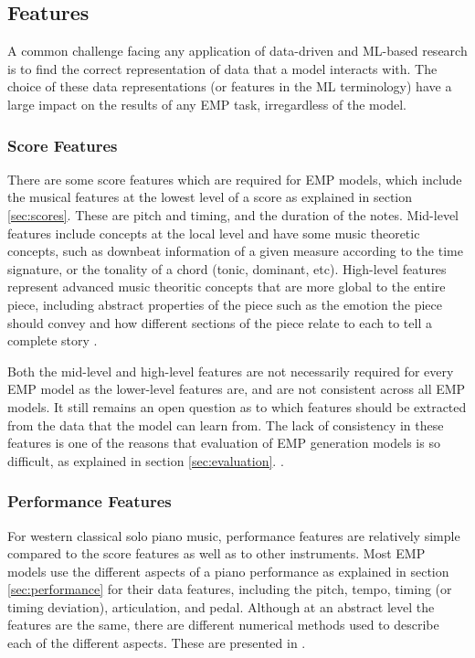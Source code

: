 \subsection{Features}
A common challenge facing any application of data-driven and ML-based research is to find the correct representation of data that a model interacts with. The choice of these data representations (or features in the ML terminology) have a large impact on the results of any EMP task, irregardless of the model. 

\subsubsection{Score Features}

There are some score features which are required for EMP models, which include the musical features at the lowest level of a score as explained in section \ref{sec:scores}. These are pitch and timing, and the duration of the notes. Mid-level features include concepts at the local level and have some music theoretic concepts, such as downbeat information of a given measure according to the time signature, or the tonality of a chord (tonic, dominant, etc). High-level features represent advanced music theoritic concepts that are more global to the entire piece, including abstract properties of the piece such as the emotion the piece should convey and how different sections of the piece relate to each to tell a complete story \cite{eduardo2018computational}. 

Both the mid-level and high-level features are not necessarily required for every EMP model as the lower-level features are, and are not consistent across all EMP models. It still remains an open question as to which features should be extracted from the data that the model can learn from. The lack of consistency in these features is one of the reasons that evaluation of EMP generation models is so difficult, as explained in section \ref{sec:evaluation}. . 

\subsubsection{Performance Features}
For western classical solo piano music, performance features are relatively simple compared to the score features as well as to other instruments. Most EMP models use the different aspects of a piano performance as explained in section \ref{sec:performance} for their data features, including the pitch, tempo, timing (or timing deviation), articulation, and pedal. Although at an abstract level the features are the same, there are different numerical methods used to describe each of the different aspects. These are presented in . 

